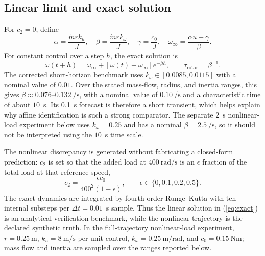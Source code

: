 \documentclass[10pt,journal]{IEEEtran}
\begin{document}
\subsection{Linear limit and exact solution}
For $c_2=0$, define
\begin{equation}
 \alpha=\frac{\dot m r k_u}{J},\quad \beta=\frac{\dot m r k_\omega}{J},\quad \gamma=\frac{c_0}{J},\quad
 \omega_\infty=\frac{\alpha u-\gamma}{\beta}.
\end{equation}
For constant control over a step $h$, the exact solution is
\begin{equation}
 \omega(t+h)=\omega_\infty+\left[\omega(t)-\omega_\infty\right]e^{-\beta h},
 \qquad \tau_\mathrm{rotor}=\beta^{-1}.
 \label{eq:exact}
\end{equation}
The corrected short-horizon benchmark uses $k_\omega\in[0.0085,0.0115]$ with a nominal value of $0.01$. Over the stated mass-flow, radius, and inertia ranges, this gives $\beta\approx0.076$--$0.132~\si{\per\second}$, with a nominal value of $0.10~\si{\per\second}$ and a characteristic time of about $10$~s. Its 0.1~s forecast is therefore a short transient, which helps explain why affine identification is such a strong comparator. The separate 2~s nonlinear-load experiment below uses $k_\omega=0.25$ and has a nominal $\beta=2.5~\si{\per\second}$, so it should not be interpreted using the $10$~s time scale.

The nonlinear discrepancy is generated without fabricating a closed-form prediction: $c_2$ is set so that the added load at $400~\si{\radian\per\second}$ is an $\epsilon$ fraction of the total load at that reference speed,
\begin{equation}
 c_2=\frac{\epsilon c_0}{400^2(1-\epsilon)},\qquad \epsilon\in\{0,0.1,0.2,0.5\}.
 \label{eq:c2}
\end{equation}
The exact dynamics are integrated by fourth-order Runge--Kutta with ten internal substeps per $\Delta t=0.01$~s sample. Thus the linear solution in (\ref{eq:exact}) is an analytical verification benchmark, while the nonlinear trajectory is the declared synthetic truth. In the full-trajectory nonlinear-load experiment, $r=0.25~\si{\metre}$, $k_u=8~\si{\metre\per\second}$ per unit control, $k_\omega=0.25~\si{\metre\per\radian}$, and $c_0=0.15~\si{\newton\metre}$; mass flow and inertia are sampled over the ranges reported below.
\end{document}
